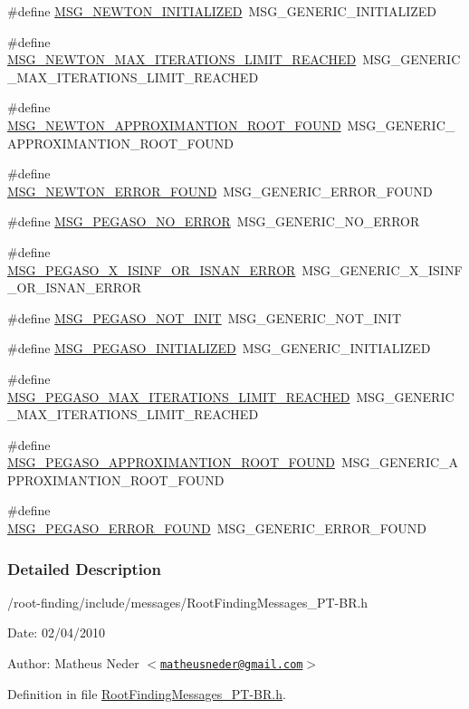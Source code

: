 \begin{CompactItemize}
\item 
\#define \hyperlink{group____messages_ga3c35d88429baed6d9cc86243ea0370c}{MSG\_\-NEWTON\_\-INITIALIZED}~MSG\_\-GENERIC\_\-INITIALIZED
\item 
\#define \hyperlink{group____messages_g945597514c7386c4cf8501ed89dea0ec}{MSG\_\-NEWTON\_\-MAX\_\-ITERATIONS\_\-LIMIT\_\-REACHED}~MSG\_\-GENERIC\_\-MAX\_\-ITERATIONS\_\-LIMIT\_\-REACHED
\item 
\#define \hyperlink{group____messages_g6a854f8d5023cff404a1462cb4ec86ec}{MSG\_\-NEWTON\_\-APPROXIMANTION\_\-ROOT\_\-FOUND}~MSG\_\-GENERIC\_\-APPROXIMANTION\_\-ROOT\_\-FOUND
\item 
\#define \hyperlink{group____messages_g07aef7b29efc8c9c6175746948f1e909}{MSG\_\-NEWTON\_\-ERROR\_\-FOUND}~MSG\_\-GENERIC\_\-ERROR\_\-FOUND
\item 
\#define \hyperlink{group____messages_g007c9369adc25cf104727b8838460c48}{MSG\_\-PEGASO\_\-NO\_\-ERROR}~MSG\_\-GENERIC\_\-NO\_\-ERROR
\item 
\#define \hyperlink{group____messages_g0785e9a82bbfd11bf313a7bde2f302dd}{MSG\_\-PEGASO\_\-X\_\-ISINF\_\-OR\_\-ISNAN\_\-ERROR}~MSG\_\-GENERIC\_\-X\_\-ISINF\_\-OR\_\-ISNAN\_\-ERROR
\item 
\#define \hyperlink{group____messages_ga35bc5993a30a166820f1bbf7843646d}{MSG\_\-PEGASO\_\-NOT\_\-INIT}~MSG\_\-GENERIC\_\-NOT\_\-INIT
\item 
\#define \hyperlink{group____messages_g1f0c0e6ae1166d8ebb0e48216dbd2c8b}{MSG\_\-PEGASO\_\-INITIALIZED}~MSG\_\-GENERIC\_\-INITIALIZED
\item 
\#define \hyperlink{group____messages_g7559f15f358baf95e22bf7c7acea5fa1}{MSG\_\-PEGASO\_\-MAX\_\-ITERATIONS\_\-LIMIT\_\-REACHED}~MSG\_\-GENERIC\_\-MAX\_\-ITERATIONS\_\-LIMIT\_\-REACHED
\item 
\#define \hyperlink{group____messages_g4d326b97fe84c2b5bb115e5c98e7b10e}{MSG\_\-PEGASO\_\-APPROXIMANTION\_\-ROOT\_\-FOUND}~MSG\_\-GENERIC\_\-APPROXIMANTION\_\-ROOT\_\-FOUND
\item 
\#define \hyperlink{group____messages_g7dea968f607ba6d45ced25ab97a9030c}{MSG\_\-PEGASO\_\-ERROR\_\-FOUND}~MSG\_\-GENERIC\_\-ERROR\_\-FOUND
\end{CompactItemize}


\subsubsection{Detailed Description}
/root-finding/include/messages/RootFindingMessages\_\-PT-BR.h 

\begin{Desc}
\item[Date:]02/04/2010 \end{Desc}
\begin{Desc}
\item[Author:]Matheus Neder $<$\href{mailto:matheusneder@gmail.com}{\tt matheusneder@gmail.com}$>$ \end{Desc}


Definition in file \hyperlink{RootFindingMessages__PT-BR_8h-source}{RootFindingMessages\_\-PT-BR.h}.